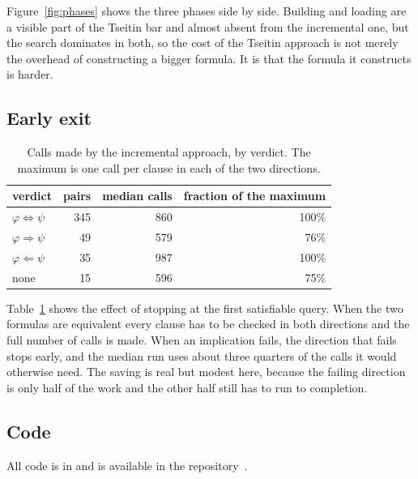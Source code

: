 \documentclass[11pt,a4paper]{article}
\begin{document}
Figure~\ref{fig:phases} shows the three phases side by side. Building and
loading are a visible part of the Tseitin bar and almost absent from the
incremental one, but the search dominates in both, so the cost of the Tseitin
approach is not merely the overhead of constructing a bigger formula. It is
that the formula it constructs is harder.

\subsection*{Early exit}

\begin{table}[H]
\centering
\begin{tabular}{lrrr}
\toprule
verdict & pairs & median calls & fraction of the maximum \\
\midrule
$\varphi \Leftrightarrow \psi$ & 345 & 860 & 100\% \\
$\varphi \Rightarrow \psi$ & 49 & 579 & 76\% \\
$\varphi \Leftarrow \psi$ & 35 & 987 & 100\% \\
none & 15 & 596 & 75\% \\
\bottomrule
\end{tabular}
\caption{Calls made by the incremental approach, by verdict. The maximum is
one call per clause in each of the two directions.}
\label{tab:early}
\end{table}

Table~\ref{tab:early} shows the effect of stopping at the first satisfiable
query. When the two formulas are equivalent every clause has to be checked in
both directions and the full number of calls is made. When an implication
fails, the direction that fails stops early, and the median run uses about
three quarters of the calls it would otherwise need. The saving is real but
modest here, because the failing direction is only half of the work and the
other half still has to run to completion.

\subsection*{Code}

All code is in  and is available in the
repository~\cite{repo}.
\end{document}
